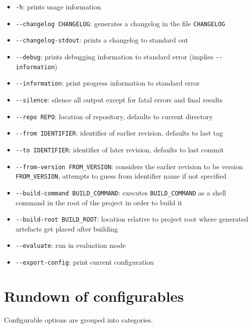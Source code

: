 \documentclass{l4proj}
\newcommand\genericstyle{\lstset{basicstyle=\ttm}}
\newcommand\codeinline[1]{{\genericstyle\lstinline!#1!}}
\begin{document}
\begin{appendices}
\begin{itemize}
\item \codeinline{-h}: prints usage information
\item \codeinline{--changelog CHANGELOG}: generates a changelog in the
file \codeinline{CHANGELOG}
\item \codeinline{--changelog-stdout}: prints a changelog to standard
out
\item \codeinline{--debug}: prints debugging information to standard
error (implies \codeinline{--information})
\item \codeinline{--information}: print progress information to
standard error
\item \codeinline{--silence}: silence all output except for fatal
errors and final results
\item \codeinline{--repo REPO}: location of repository, defaults to current
directory
\item \codeinline{--from IDENTIFIER}: identifier of earlier revision,
defaults to last tag
\item \codeinline{--to IDENTIFIER}: identifier of later revision, defaults to
last commit
\item \codeinline{--from-version FROM_VERSION}: considers the earlier
revision to be version \codeinline{FROM_VERSION}, attempts to guess
from identifier name if not specified
\item \codeinline{--build-command BUILD_COMMAND}: executes
\codeinline{BUILD_COMMAND} as a shell command in the root of the
project in order to build it
\item \codeinline{--build-root BUILD_ROOT}: location relative to
project root where generated artefacts get placed after building
\item \codeinline{--evaluate}: run in evaluation mode
\item \codeinline{--export-config}: print current configuration
\end{itemize}

\section{Rundown of configurables}
\label{RundownConfigurables}

Configurable options are grouped into categories.


\end{appendices}
\end{document}
